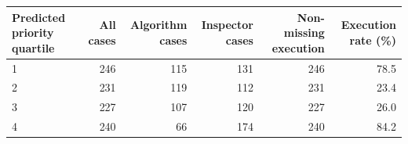 \begin{tabular}[t]{lrrrrr}
\toprule
Predicted priority quartile & All cases & Algorithm cases & Inspector cases & Non-missing execution & Execution rate (\%)\\
\midrule
1 & 246 & 115 & 131 & 246 & 78.5\\
2 & 231 & 119 & 112 & 231 & 23.4\\
3 & 227 & 107 & 120 & 227 & 26.0\\
4 & 240 & 66 & 174 & 240 & 84.2\\
\bottomrule
\end{tabular}
